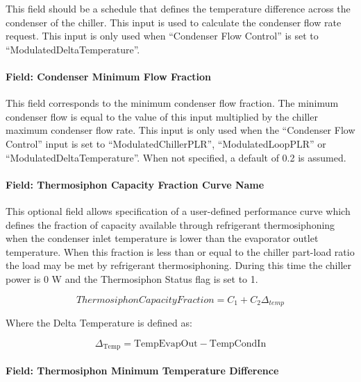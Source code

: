 This field should be a schedule that defines the temperature difference across the condenser of the chiller. This input is used to calculate the condenser flow rate request. This input is only used when ``Condenser Flow Control'' is set to ``ModulatedDeltaTemperature''.

\paragraph{Field: Condenser Minimum Flow Fraction}

This field corresponds to the minimum condenser flow fraction. The minimum condenser flow is equal to the value of this input multiplied by the chiller maximum condenser flow rate. This input is only used when the ``Condenser Flow Control'' input is set to ``ModulatedChillerPLR'', ``ModulatedLoopPLR'' or ``ModulatedDeltaTemperature''. When not specified, a default of 0.2 is assumed.

\paragraph{Field: Thermosiphon Capacity Fraction Curve Name}\label{thermosiphon-capacity-fraction-curve-name3}

This optional field allows specification of a user-defined performance curve which defines the fraction of capacity available through refrigerant thermosiphoning when the condenser inlet temperature is lower than the evaporator outlet temperature. When this fraction is less than or equal to the chiller part-load ratio the load may be met by refrigerant thermosiphoning. During this time the chiller power is 0 W and the Thermosiphon Status flag is set to 1.

\begin{equation}
    ThermosiphonCapacityFraction = {C_1} + {C_2}{\Delta_{temp}}
\end{equation}

Where the Delta Temperature is defined as:

\begin{equation}
{\Delta_{{\mathrm{Temp}}}}
    = {\mathrm{TempEvapOut  -  TempCondIn }}
\end{equation}

\paragraph{Field: Thermosiphon Minimum Temperature Difference}\label{thermosiphon-minimum-temperature-difference3}

